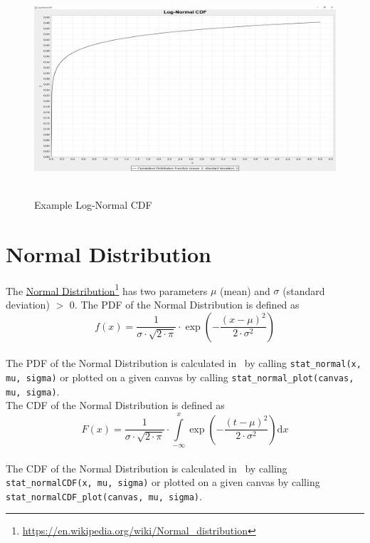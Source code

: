 		\begin{figure}[H]
			\centering
			\includegraphics[width=1\textwidth]{Figures/implemented_functions/log_normal_cdf}~\\
			\caption{Example Log-Normal CDF}
			\label{fig:log_normal_cdf}
		\end{figure}


	\section{Normal Distribution}
	
		The \href{https://en.wikipedia.org/wiki/Normal_distribution}{Normal Distribution}\footnote{\url{https://en.wikipedia.org/wiki/Normal_distribution}} has two parameters $\mu$ (mean) and $\sigma$ (standard deviation) $>$ 0. The \ac{PDF} of the Normal Distribution is defined as
		\\[0.3cm]
		$$f(x) = \frac{1}{\sigma \cdot \sqrt{2 \cdot \pi}} \cdot \exp\left(-\frac{(x-\mu)^2}{2 \cdot \sigma^2}\right)$$
		\\[0.3cm]
		The \ac{PDF} of the Normal Distribution is calculated in \setlx\ by calling \lstinline{stat_normal(x, mu, sigma)} or plotted on a given canvas by calling \lstinline{stat_normal_plot(canvas, mu, sigma)}.
		\\[0.3cm]
		The \ac{CDF} of the Normal Distribution is defined as
		\\[0.3cm]
		$$F(x) = \frac{1}{\sigma \cdot \sqrt{2 \cdot \pi}} \cdot 
			\int\limits_{-\infty}^x \exp\left(-\frac{(t-\mu)^2}{2 \cdot \sigma^2}\right) \mathrm{d}x$$
		\\[0.3cm]
		The \ac{CDF} of the Normal Distribution is calculated in \setlx\ by calling \lstinline{stat_normalCDF(x, mu, sigma)} or plotted on a given canvas by calling \lstinline{stat_normalCDF_plot(canvas, mu, sigma)}.

